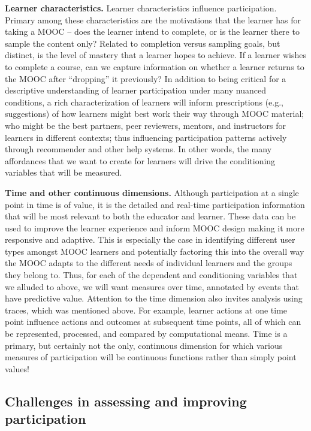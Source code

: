 \textbf{Learner characteristics.} Learner characteristics influence
participation. Primary among these characteristics are the motivations
that the learner has for taking a MOOC -- does the learner intend to
complete, or is the learner there to sample the content only? Related to
completion versus sampling goals, but distinct, is the level of mastery
that a learner hopes to achieve. If a learner wishes to complete a
course, can we capture information on whether a learner returns to the
MOOC after ``dropping'' it previously?  In addition to being critical for
a descriptive understanding of learner participation under many nuanced
conditions, a rich characterization of learners will inform
prescriptions (e.g., suggestions) of how learners might best work their
way through MOOC material; who might be the best partners, peer
reviewers, mentors, and instructors for learners in different contexts;
thus influencing participation patterns actively through recommender and
other help systems. In other words, the many affordances that we want to
create for learners will drive the conditioning variables that will be
measured.  

\textbf{Time and other continuous dimensions.}  Although participation
at a single point in time is of value, it is the detailed and real-time
participation information that will be most relevant to both the
educator and learner. These data can be used to improve the learner
experience and inform MOOC design making it more responsive and
adaptive. This is especially the case in identifying different user
types amongst MOOC learners and potentially factoring this into the
overall way the MOOC adapts to the different needs of individual
learners and the groups they belong to. Thus, for each of the dependent
and conditioning variables that we alluded to above, we will want
measures over time, annotated by events that have predictive value.
Attention to the time dimension also invites analysis using traces,
which was mentioned above. For example, learner actions at one time
point influence actions and outcomes at subsequent time points, all of
which can be represented, processed, and compared by computational
means.  Time is a primary, but certainly not the only, continuous
dimension for which various measures of participation will be continuous
functions rather than simply point values!

\subsection{Challenges in assessing and improving participation}

